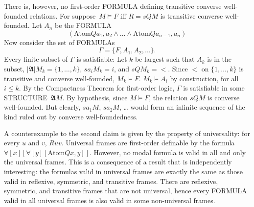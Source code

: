 \documentclass[10pt,a4paper]{article}
\newcommand*{\olup}[1]{\MakeUppercase{#1}}
\theoremstyle{plain}
\theoremstyle{definition}
\theoremstyle{remark}
\newcommand*{\olchapter}[3]{}
\newcommand*{\olimport}[1]{}
\providecommand{\lforall}{\mathord{\forall}}
\providecommand{\Struct}{\ensuremath{\mathfrak{A}}}
\providecommand{\Domain}{\ensuremath{|\mathfrak{A}|}}
\providecommand{\Assign}{\ensuremath{s}}
\providecommand{\Sat}[2]{\ensuremath{#1 \models #2}}
\providecommand{\Atom}{\mathrm{Atom}}
\begin{document}
There is, however, no first-order \olup{formula} defining transitive
converse well-founded relations. For suppose~$\Sat{M}{F}$ iff $R =
\Assign{Q}{M}$ is transitive converse well-founded. Let $A_n$ be the
\olup{formula}
\[
(\Atom{Q}{a_1,a_2} \land \dots \land
    \Atom{Q}{a_{n-1},a_{n}})
\]
Now consider the set of \olup{formula}s
\[
\Gamma = \{F, A_1, A_2, \dots\}.
\]
Every finite subset of $\Gamma$ is satisfiable: Let $k$ be largest
such that $A_k$ is in the subset, $\Domain{M_k} = \{1, \dots, k\}$,
$\Assign{a_i}{M_k} = i$, and $\Assign{Q}{M_k} = <$. Since $<$ on $\{1,
\dots, k\}$ is transitive and converse well-founded,
$\Sat{M_k}{F}$. $\Sat{M_k}{A_i}$ by construction, for all $i \le k$.
By the Compactness Theorem for first-order logic, $\Gamma$ is
satisfiable in some \olup{structure}~$\Struct{M}$. By hypothesis, since
$\Sat{M}{F}$, the relation $\Assign{Q}{M}$ is converse
well-founded. But clearly, $\Assign{a_1}{M}$, $\Assign{a_2}{M}$,
\dots{} would form an infinite sequence of the kind ruled out by
converse well-foundedness.

A counterexample to the second claim is given by the property of
universality: for every $u$ and $v$, $Ruv$. Universal frames are
first-order definable by the formula
$\lforall[x][\lforall[y][\Atom{Q}{x,y}]]$.  However, no modal formula
is valid in all and only the universal frames. This is a consequence
of a result that is independently interesting: the formulas valid in
universal frames are exactly the same as those valid in reflexive,
symmetric, and transitive frames. There are reflexive, symmetric, and
transitive frames that are not universal, hence every \olup{formula}
valid in all universal frames is also valid in some non-universal
frames.





\olchapter{nml}{frd}{Frame Definability}

\olimport{introduction}
\olimport{properties-accessibility}
\olimport{frames}
\olimport{definability}
\olimport{first-order-definability}
\olimport{equivalence-S5}
\olimport{second-order-definability}

\OLEndChapterHook



\end{document}

